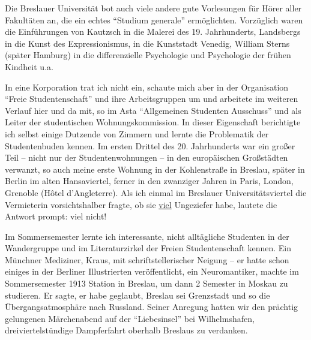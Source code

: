 \documentclass[a5paper,pagesize,10pt,twoside=true]{scrbook}
\renewcommand{\marginpar}[2][]{}
\begin{document}
\marginpar{151}
Die Breslauer Universität bot auch viele andere gute Vorlesungen für Hörer aller Fakultäten an, die ein echtes \enquote{Studium generale} ermöglichten. Vorzüglich waren die Einführungen von Kautzsch in die Malerei des 19. Jahrhunderts, Landsbergs in die Kunst des Expressionismus, in die Kunststadt Venedig, William Sterns (später Hamburg) in die differenzielle Psychologie und Psychologie der frühen Kindheit u.a.

In eine Korporation trat ich nicht ein, schaute mich aber in der Organisation \enquote{Freie Studentenschaft} und ihre Arbeitsgruppen um und arbeitete im weiteren Verlauf hier und da mit, so im Asta \enquote{Allgemeinen Studenten Ausschuss} und als Leiter der studentischen Wohnungskommission. In dieser Eigenschaft berichtigte ich selbst einige Dutzende von Zimmern und lernte die Problematik der Studentenbuden kennen. Im ersten Drittel des 20. Jahrhunderts war ein großer Teil -- nicht nur der Studentenwohnungen -- in den europäischen Großstädten verwanzt, so auch meine erste Wohnung in der Kohlenstraße in Breslau, später in Berlin im alten Hansaviertel, ferner in den zwanziger Jahren in Paris, London, Grenoble (Hôtel d'Angleterre). Als ich einmal im Breslauer Universitätsviertel die Vermieterin vorsichtshalber fragte, ob sie \underline{viel} Ungeziefer habe, lautete die Antwort prompt: viel nicht!

Im Sommersemester lernte ich interessante, nicht alltägliche Studenten in der Wandergruppe und im Literaturzirkel der Freien Studentenschaft kennen. Ein Münchner Mediziner, Kraus, mit schriftstellerischer Neigung -- er hatte schon einiges in der Berliner Illustrierten veröffentlicht, ein Neuromantiker, machte im Sommersemester 1913 Station in Breslau, um dann 2 Semester in Moskau zu studieren. Er sagte, er habe geglaubt, Breslau sei Grenzstadt und so die Übergangsatmosphäre nach Russland. Seiner Anregung hatten wir den prächtig gelungenen Märchenabend auf der \enquote{Liebesinsel} bei Wilhelmshafen, dreiviertelstündige Dampferfahrt oberhalb Breslaus zu verdanken.
\end{document}
